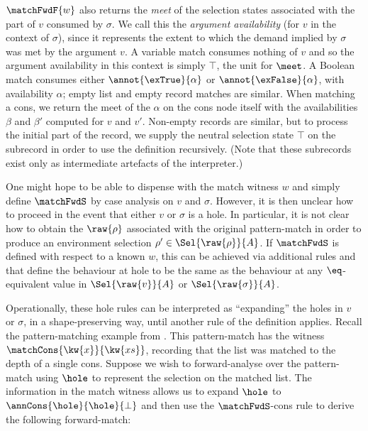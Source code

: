 $\matchFwdF{w}$ also returns the \emph{meet} of the selection states associated with the part of $v$ consumed by $\sigma$. We call this the \emph{argument availability} (for $v$ in the context of $\sigma$), since it represents the extent to which the demand implied by $\sigma$ was met by the argument $v$. A variable match consumes nothing of $v$ and so the argument availability in this context is simply $\top$, the unit for $\meet$. A Boolean match consumes either $\annot{\exTrue}{\alpha}$ or $\annot{\exFalse}{\alpha}$, with availability $\alpha$; empty list and empty record matches are similar. When matching a cons, we return the meet of the $\alpha$ on the cons node itself with the availabilities $\beta$ and $\beta'$ computed for $v$ and $v'$. Non-empty records are similar, but to process the initial part of the record, we supply the neutral selection state $\top$ on the subrecord in order to use the definition recursively. (Note that these subrecords exist only as intermediate artefacts of the interpreter.)

One might hope to be able to dispense with the match witness $w$ and simply define $\matchFwdS$ by case analysis on $v$ and $\sigma$. However, it is then unclear how to proceed in the event that either $v$ or $\sigma$ is a hole. In particular, it is not clear how to obtain the $\raw{\rho}$ associated with the original pattern-match in order to produce an environment selection $\rho' \in \Sel{\raw{\rho}}{A}$. If $\matchFwdS$ is defined with respect to a known $w$, this can be achieved via additional rules  and  that define the behaviour at hole to be the same as the behaviour at any $\eq$-equivalent value in $\Sel{\raw{v}}{A}$ or $\Sel{\raw{\sigma}}{A}$.

Operationally, these hole rules can be interpreted as ``expanding'' the holes in $v$ or $\sigma$, in a shape-preserving way, until another rule of the definition applies. Recall the pattern-matching example from . This pattern-match has the witness $\matchCons{\kw{x}}{\kw{xs}}$, recording that the list  was matched to the depth of a single cons. Suppose we wish to forward-analyse over the pattern-match using $\hole$ to represent the selection on the matched list. The information in the match witness allows us to expand $\hole$ to $\annCons{\hole}{\hole}{\bot}$ and then use the $\matchFwdS$-cons rule to derive the following forward-match:

